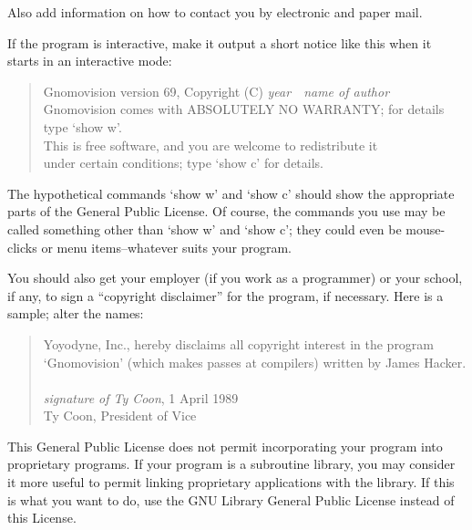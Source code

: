 \documentclass[se]{uw-wkrpt}
\begin{document}
\begin{singlespacing}
Also add information on how to contact you by electronic and paper mail.

If the program is interactive, make it output a short notice like this
when it starts in an interactive mode:
\begin{quote}\ttfamily\footnotesize
    Gnomovision version 69, Copyright (C) \emph{year}\ \ 
    \emph{name of author}\\
    Gnomovision comes with ABSOLUTELY NO WARRANTY; for details type `show w'.\\
    This is free software, and you are welcome to redistribute it\\
    under certain conditions; type `show c' for details.
\end{quote}

The hypothetical commands `show w' and `show c' should show the appropriate
parts of the General Public License.  Of course, the commands you use may
be called something other than `show w' and `show c'; they could even be
mouse-clicks or menu items--whatever suits your program.

You should also get your employer (if you work as a programmer) or your
school, if any, to sign a ``copyright disclaimer'' for the program, if
necessary.  Here is a sample; alter the names:
\begin{quote}\ttfamily\footnotesize
  Yoyodyne, Inc., hereby disclaims all copyright interest in the program\\
  `Gnomovision' (which makes passes at compilers) written by James Hacker.\\
\mbox{}\\
  \emph{signature of Ty Coon}, 1 April 1989\\
  Ty Coon, President of Vice
\end{quote}

This General Public License does not permit incorporating your program into
proprietary programs.  If your program is a subroutine library, you may
consider it more useful to permit linking proprietary applications with the
library.  If this is what you want to do, use the GNU Library General
Public License instead of this License.

\end{singlespacing}
\end{document}
